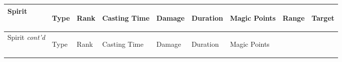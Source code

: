 \documentclass[twoside]{book}
\begin{document}
\begin{longtable}{p{1.25in}lp{2em}p{3em}llp{7em}ll} 
  Spirit
  &
  \begin{turn}{70}{Type}\end{turn}
          
  &
  \begin{turn}{70}{Rank}\end{turn}
          
  &
  \begin{turn}{70}{Casting Time}\end{turn}
          
  &
  \begin{turn}{70}{Damage}\end{turn}
          
  &
  \begin{turn}{70}{Duration}\end{turn}
          
  &
  \begin{turn}{70}{Magic Points}\end{turn}
          
  &
  \begin{turn}{70}{Range}\end{turn}
          
  &
  \begin{turn}{70}{Target}\end{turn}
          
  \\
  \hline
  \hline
  \endfirsthead
  Spirit \textit{cont'd}
        
  &
  \begin{turn}{70}{Type}\end{turn}
          
  &
  \begin{turn}{70}{Rank}\end{turn}
          
  &
  \begin{turn}{70}{Casting Time}\end{turn}
          
  &
  \begin{turn}{70}{Damage}\end{turn}
          
  &
  \begin{turn}{70}{Duration}\end{turn}
          
  &
  \begin{turn}{70}{Magic Points}\end{turn}
          

\end{longtable}
\end{document}
